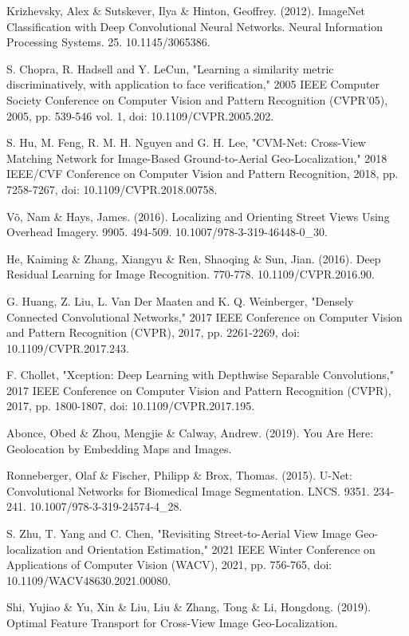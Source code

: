 \documentclass[10pt,letterpaper]{article}
\begin{document}
\begin{thebibliography}{10}
  Krizhevsky, Alex \& Sutskever, Ilya \& Hinton, Geoffrey. (2012). ImageNet Classification with Deep Convolutional Neural Networks. Neural Information Processing Systems. 25. 10.1145/3065386. 
  
  S. Chopra, R. Hadsell and Y. LeCun, "Learning a similarity metric discriminatively, with application to face verification," 2005 IEEE Computer Society Conference on Computer Vision and Pattern Recognition (CVPR'05), 2005, pp. 539-546 vol. 1, doi: 10.1109/CVPR.2005.202.
  
  S. Hu, M. Feng, R. M. H. Nguyen and G. H. Lee, "CVM-Net: Cross-View Matching Network for Image-Based Ground-to-Aerial Geo-Localization," 2018 IEEE/CVF Conference on Computer Vision and Pattern Recognition, 2018, pp. 7258-7267, doi: 10.1109/CVPR.2018.00758.
  
  Võ, Nam \& Hays, James. (2016). Localizing and Orienting Street Views Using Overhead Imagery. 9905. 494-509. 10.1007/978-3-319-46448-0\_30. 
  
  He, Kaiming \& Zhang, Xiangyu \& Ren, Shaoqing \& Sun, Jian. (2016). Deep Residual Learning for Image Recognition. 770-778. 10.1109/CVPR.2016.90. 
  
  G. Huang, Z. Liu, L. Van Der Maaten and K. Q. Weinberger, "Densely Connected Convolutional Networks," 2017 IEEE Conference on Computer Vision and Pattern Recognition (CVPR), 2017, pp. 2261-2269, doi: 10.1109/CVPR.2017.243.
  
  F. Chollet, "Xception: Deep Learning with Depthwise Separable Convolutions," 2017 IEEE Conference on Computer Vision and Pattern Recognition (CVPR), 2017, pp. 1800-1807, doi: 10.1109/CVPR.2017.195.
  
  Abonce, Obed \& Zhou, Mengjie \& Calway, Andrew. (2019). You Are Here: Geolocation by Embedding Maps and Images. 
  
  Ronneberger, Olaf \& Fischer, Philipp \& Brox, Thomas. (2015). U-Net: Convolutional Networks for Biomedical Image Segmentation. LNCS. 9351. 234-241. 10.1007/978-3-319-24574-4\_28. 
  
  S. Zhu, T. Yang and C. Chen, "Revisiting Street-to-Aerial View Image Geo-localization and Orientation Estimation," 2021 IEEE Winter Conference on Applications of Computer Vision (WACV), 2021, pp. 756-765, doi: 10.1109/WACV48630.2021.00080.
  
  Shi, Yujiao \& Yu, Xin \& Liu, Liu \& Zhang, Tong \& Li, Hongdong. (2019). Optimal Feature Transport for Cross-View Image Geo-Localization. 
  

\end{thebibliography}
\end{document}
